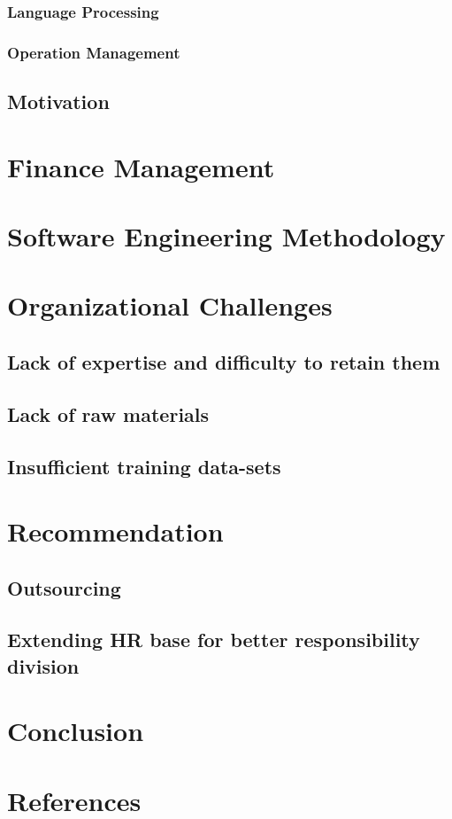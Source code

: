 \documentclass[12pt,a4paper]{scrreprt}
\begin{document}
\subsection{Language Processing}
\subsection{Operation Management}

\section{Motivation}

\chapter{Finance Management}
\chapter{Software Engineering Methodology}

\chapter{Organizational Challenges}
\section{Lack of expertise and difficulty to retain them}
\section{Lack of raw materials}
\section{Insufficient training data-sets}

\chapter{Recommendation}
\section{Outsourcing}
\section{Extending HR base for better responsibility division}

\chapter{Conclusion}
\chapter*{References}

\end{document}
